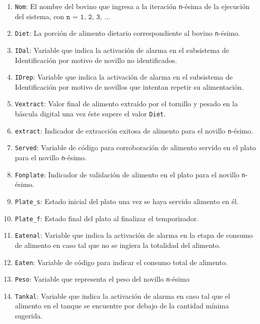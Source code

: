 \begin{enumerate}
    \item \texttt{Nom}: El nombre del bovino que ingresa a la iteración \texttt{n}-ésima de la ejecución del sistema, con $\texttt{n = 1, 2, 3, \ldots}$
    \item \texttt{Diet}: La porción de alimento dietario correspondiente al bovino \texttt{n}-ésimo.
    \item \texttt{IDal}: Variable que indica la activación de alarma en el subsistema de Identificación por motivo de novillo no identificados.
    \item \texttt{IDrep}: Variable que indica la activación de alarma en el subsistema de Identificación por motivo de novillos que intentan repetir su alimentación. 
    \item \texttt{Vextract}: Valor final de alimento extraído por el tornillo y pesado en la báscula digital una vez éste supere el valor \texttt{Diet}.
    \item \texttt{extract}: Indicador de extracción exitosa de alimento para el novillo \texttt{n}-ésimo.
    \item \texttt{Served}: Variable de código para corroboración de alimento servido en el plato para el novillo \texttt{n}-ésimo.
    \item \texttt{Fonplate}: Indicador de validación de alimento en el plato para el novillo \texttt{n}-ésimo.
    \item \texttt{Plate\_s}: Estado inicial del plato una vez se haya servido alimento en él.
    \item \texttt{Plate\_f}: Estado final del plato al finalizar el temporizador.
    \item \texttt{Eatenal}: Variable que indica la activación de alarma en la etapa de consumo de alimento en caso tal que no se ingiera la totalidad del alimento.
    \item \texttt{Eaten}: Variable de código para indicar el consumo total de alimento.
    \item \texttt{Peso}: Variable que representa el peso del novillo \texttt{n}-ésimo
    \item \texttt{Tankal}: Variable que indica la activación de alarma en caso tal que el alimento en el tanque se encuentre por debajo de la cantidad mínima sugerida.
\end{enumerate}


